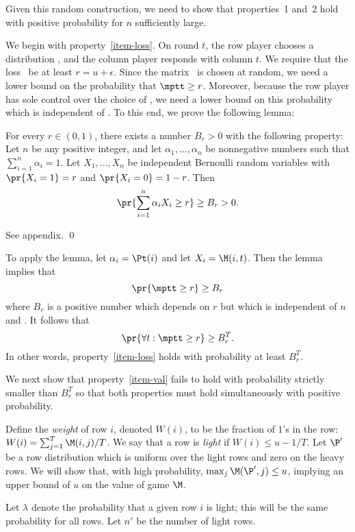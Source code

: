 Given this random construction, we need to show that properties~1
and~2 hold with positive probability for $n$ sufficiently large.

We begin with property~\ref{item-loss}.
On round $t$, the row player chooses a distribution \Pt, and the
column player responds with column $t$.
We require that the loss \mptt\ be at least $r = u+\epsilon$.
Since the matrix \M\ is chosen at random, we need a lower bound on the
probability that $\mptt \geq r$.
Moreover, because the row player has sole control over the choice of
\Pt, we need a lower bound on this probability which is independent of
\Pt.
To this end, we prove the following lemma:

\begin{lemma} \label{lem:prob-bnd}
For every $r\in (0,1)$, there exists a number $B_r > 0$ with the
following property:
Let $n$ be any positive integer, and let $\alpha_1,\ldots,\alpha_n$ be
nonnegative numbers such that $\sum_{i=1}^n \alpha_i = 1$.
Let $X_1,\ldots,X_n$ be independent Bernoulli random variables with
$\pr{X_i=1} = r$ and $\pr{X_i=0} = 1-r$.
Then
\[
\pr{\sum_{i=1}^n \alpha_i X_i \geq r} \geq B_r > 0.
\]
\end{lemma}

\proof
See appendix.
\qed

To apply the lemma, let $\alpha_i = \Pt(i)$ and let $X_i = \M(i,t)$.
Then the lemma implies that 
\[\pr{\mptt \geq r} \geq B_r\]
where $B_r$
is a positive number which depends on $r$ but which is independent of $n$
and \Pt.
It follows that
\[\pr{\forall t: \mptt \geq r} \geq B_r^T.\]
In other words, property~\ref{item-loss} holds with probability at
least $B_r^T$.

We next show that property~\ref{item-val} fails to hold with
probability strictly smaller than $B_r^T$ so that both properties must
hold simultaneously with positive probability.

Define the {\em weight\/} of row $i$, denoted $W(i)$, to be the fraction of
$1$'s in the row: $W(i) = \sum_{j=1}^T \M(i,j) / T$.
We say that a row is {\em light\/} if $W(i)\leq u - 1/T$.
Let $\P'$ be a row distribution which is uniform over the light
rows and zero on the heavy rows.
We will show that, with high probability, $\max_j \M(\P',j) \leq u$,
implying an upper bound of $u$ on the value of game $\M$.

Let $\lambda$ denote the probability that a given row $i$ is
light; this will be the same probability for all rows.
Let $n'$ be the number of light rows.


